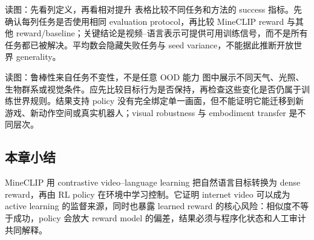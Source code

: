 
\begin{knowledgebox}{读图：先看列定义，再看相对提升}
表格比较不同任务和方法的 success 指标。先确认每列任务是否使用相同 evaluation protocol，再比较 MineCLIP reward 与其他 reward/baseline；关键结论是视频--语言表示可提供可用训练信号，而不是所有任务都已被解决。平均数会隐藏失败任务与 seed variance，不能据此推断开放世界 generality。
\end{knowledgebox}


\begin{knowledgebox}{读图：鲁棒性来自任务不变性，不是任意 OOD 能力}
图中展示不同天气、光照、生物群系或视觉条件。应先比较目标行为是否保持，再检查这些变化是否仍属于训练世界规则。结果支持 policy 没有完全绑定单一画面，但不能证明它能迁移到新游戏、新动作空间或真实机器人；visual robustness 与 embodiment transfer 是不同层次。
\end{knowledgebox}


\subsection{本章小结}

MineCLIP 用 contrastive video--language learning 把自然语言目标转换为 dense reward，再由 RL policy 在环境中学习控制。它证明 internet video 可以成为 active learning 的监督来源，同时也暴露 learned reward 的核心风险：相似度不等于成功，policy 会放大 reward model 的偏差，结果必须与程序化状态和人工审计共同解释。

